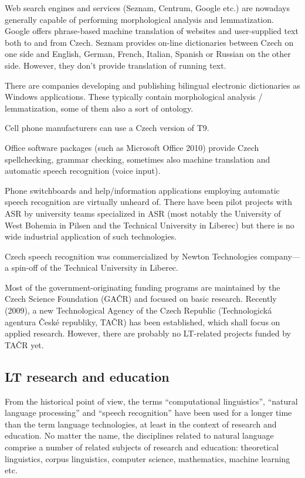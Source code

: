 \begin{multicols}{2}
Web search engines and services (Seznam, Centrum, Google etc.) are nowadays generally capable of performing morphological analysis and lemmatization. Google offers phrase-based machine translation of websites and user-supplied text both to and from Czech. Seznam provides on-line dictionaries between Czech on one side and English, German, French, Italian, Spanish or Russian on the other side. However, they don’t provide translation of running text.

There are companies developing and publishing bilingual electronic dictionaries as Windows applications. These typically contain morphological analysis / lemmatization, some of them also a sort of ontology.

Cell phone manufacturers can use a Czech version of T9.

Office software packages (such as Microsoft Office 2010) provide Czech spellchecking, grammar checking, sometimes also machine translation and automatic speech recognition (voice input).

Phone switchboards and help/information applications employing automatic speech recognition are virtually unheard of. There have been pilot projects with ASR by university teams specialized in ASR (most notably the University of West Bohemia in Pilsen and the Technical University in Liberec) but there is no wide industrial application of such technologies.

Czech speech recognition was commercialized by Newton Technologies company—a spin-off of the Technical University in Liberec.

Most of the government-originating funding programs are maintained by the Czech Science Foundation (GAČR) and focused on basic research. Recently (2009), a new Technological Agency of the Czech Republic (Technologická agentura České republiky, TAČR) has been established, which shall focus on applied research. However, there are probably no LT-related projects funded by TAČR yet.

\subsection{LT research and education}

From the historical point of view, the terms ``computational linguistics'', ``natural language processing'' and ``speech recognition'' have been used for a longer time than the term language technologies, at least in the context of research and education. No matter the name, the disciplines related to natural language comprise a number of related subjects of research and education: theoretical linguistics, corpus linguistics, computer science, mathematics, machine learning etc.


\end{multicols}
